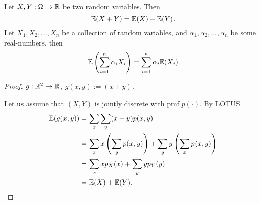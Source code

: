 \documentclass[10pt, a4paper]{article}
\begin{document}
\begin{theorem}
    Let $X, Y : \Omega \rightarrow \mathbb{R}$ be two random variables.
    Then
    \[
    \mathbb{E}(X + Y) = \mathbb{E}(X) + \mathbb{E}(Y).
    \]
    Let $X_1, X_2, \dotsc, X_n$ be a collection of random variables,
    and $\alpha_1, \alpha_2, \dotsc, \alpha_n$ be some real-numbers,
    then
    \[
    \mathbb{E}\left(\sum_{i = 1}^{n}\alpha_iX_i\right) = \sum_{i = 1}^{n}\alpha_i\mathbb{E}(X_i)
    \]
    \begin{proof}
        $g : \mathbb{R} ^ 2 \rightarrow \mathbb{R}$,
        $g(x, y) := (x + y)$.

        Let us assume that $(X, Y)$ is jointly discrete with pmf $p(\cdot)$.
        By LOTUS
        \begin{align*}
            \mathbb{E}(g(x, y)) &= \sum_{x}\sum_{y}(x + y)p(x, y) \\
            &= \sum_{x}x\left(\sum_{y}p(x, y)\right) + \sum_{y}y\left(\sum_{x}p(x, y)\right) \\
            &=\sum_{x}xp_X(x) + \sum_{y}yp_Y(y) \\
            &= \mathbb{E}(X) + \mathbb{E}(Y).
        \end{align*}
    \end{proof}
\end{theorem}
\end{document}
